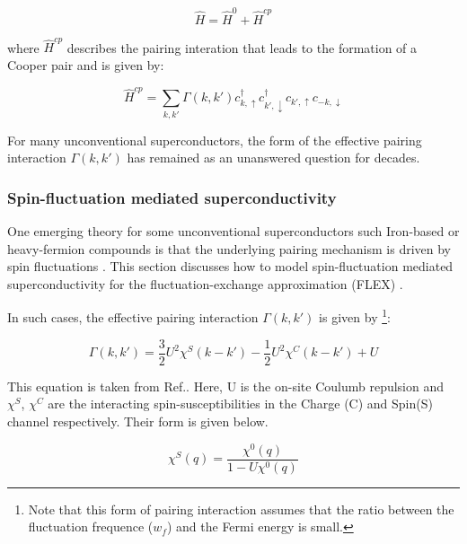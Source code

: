 \documentclass[12pt]{article}
\begin{document}
\begin{equation}\label{General Hamiltonian}
    \hat{H} = \hat{H}^0 + \hat{H}^{cp}
\end{equation}

\noindent where $\hat{H}^{cp}$ describes the pairing interation that leads to the formation of a Cooper pair and is given by:

\begin{equation}\label{Hcp}
    \hat{H}^{cp} = \sum_{k,k'} \Gamma(k, k') c^{\dagger}_{k, \uparrow}  c^{\dagger}_{k', \downarrow} c_{k', \uparrow}c_{-k, \downarrow}
\end{equation}

\noindent For many unconventional superconductors, the form of the effective pairing interaction $\Gamma(k,k')$ has remained as an unanswered question for decades.

\subsubsection{Spin-fluctuation mediated superconductivity}
\label{subsec:spinfluct}

One emerging theory for some unconventional superconductors such Iron-based or heavy-fermion compounds 
is that the underlying pairing mechanism is driven by spin fluctuations \cite{moriya2000spin}. This section discusses how to
model spin-fluctuation mediated superconductivity for the fluctuation-exchange approximation (FLEX) \cite{esirgen1997fluctuation}. \par
\medskip
\noindent In such cases, the effective pairing interaction $\Gamma(k,k')$ is given by \footnote{Note that this form of pairing interaction 
assumes that the ratio between 
the fluctuation frequence ($w_f$) and the Fermi energy is small.}:

\begin{equation}\label{Pairing interaction SF}
    \Gamma(k,k') = \frac{3}{2} U^2 \chi^S(k-k') -\frac{1}{2}U^2 \chi^C(k-k') + U
\end{equation} 

\noindent This equation is taken from Ref.\cite{migdal1958interaction}. Here, U is the on-site Coulumb repulsion and $\chi^S$, $\chi^C$ are the interacting spin-susceptibilities in the Charge (C) and Spin(S) channel respectively. Their form is given below.

\begin{equation}
    \chi^S(q) = \frac{\chi^0(q)}{1 - U \chi^0 (q)}
\end{equation}
\end{document}
